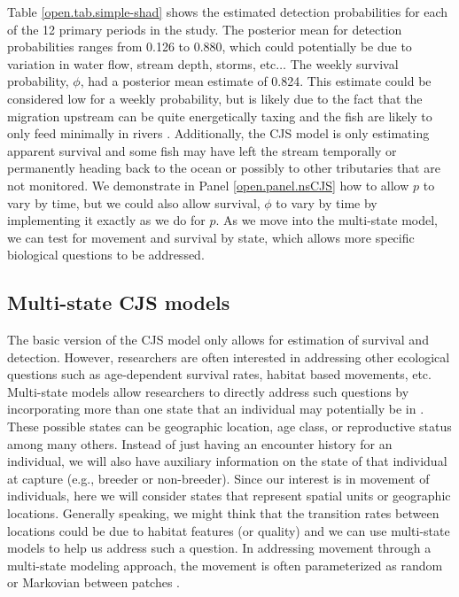 Table \ref{open.tab.simple-shad} shows the estimated detection
probabilities for each of the 12 primary periods in the study.  The
posterior mean for detection probabilities ranges from 0.126 to 0.880,
which could potentially be due to variation in water flow, stream
depth, storms, etc$\dots$ The weekly survival probability, $\phi$, had
a posterior mean estimate of 0.824.  This estimate could be considered
low for a weekly probability, but is likely due to the fact that the
migration upstream can be quite energetically taxing and the fish are
likely to only feed minimally in
rivers \citep{leggett_carscadden:1978, leonard_mccormick:1999}.
Additionally, the CJS model is only estimating apparent survival and
some fish may have left the stream temporally or permanently heading
back to the ocean or possibly to other tributaries that are not
monitored.   We demonstrate in Panel \ref{open.panel.nsCJS} how to
allow $p$ to vary by time, but we could also allow survival, $\phi$ to
vary by time by implementing it exactly as we do for $p$.  As we move into
the multi-state model, we can test for movement and survival by state,
which allows more specific biological questions to be addressed.


\subsection{Multi-state CJS models}

The basic version of the CJS model only allows for estimation of
survival and detection.  However, researchers are often interested in
addressing other ecological questions such as age-dependent survival
rates, habitat based movements, etc.  Multi-state models allow
researchers to directly address such questions by incorporating more
than one state that an individual may potentially be in
\citep{arnason:1972,arnason:1973, brownie_etal:1993}.  These possible
states can be geographic location, age class, or reproductive status
among many others.  Instead of just having an encounter history for an
individual, we will also have auxiliary information on the state of
that individual at capture (e.g., breeder or non-breeder).  Since our
interest is in movement of individuals, here we will consider states
that represent spatial units or geographic locations.  Generally
speaking, we might think that the transition rates between locations
could be due to habitat features (or quality) and we can use
multi-state models to help us address such a question.  In addressing
movement through a multi-state modeling approach, the movement is
often parameterized as random or Markovian between patches
\citep{arnason:1972,arnason:1973, schwarz_etal:1993}.

